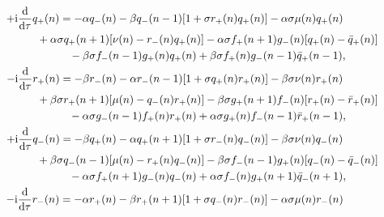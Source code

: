\documentclass[pdftex]{sigma}
\numberwithin{equation}{section}
\begin{document}
\begin{gather}
	 +\mathrm{i}\frac{\mathrm{d}}{\mathrm{d}\tau}q_{+}(n) = - \alpha q_{-}(n) - \beta q_{-}(n-1)[1+\sigma r_{+}(n)q_{+}(n)] - \alpha\sigma\mu(n)q_{+}(n)\nonumber\\
 \hspace{0.25mm}\hphantom{+\mathrm{i}\frac{\mathrm{d}}{\mathrm{d}\tau}q_{+}(n) =}{}
	 +\alpha\sigma q_{+}(n+1)[\nu(n)-r_{-}(n)q_{+}(n)] - \alpha\sigma f_{+}(n+1)g_{-}(n)[q_{+}(n)-\bar{q}_{+}(n)]\nonumber\\
 \hspace{0.25mm}\hphantom{+\mathrm{i}\frac{\mathrm{d}}{\mathrm{d}\tau}q_{+}(n) =}{}
	 -\beta\sigma f_{-}(n-1)g_{+}(n)q_{+}(n) +\beta\sigma f_{+}(n)g_{-}(n-1)\bar{q}_{+}(n-1), \label{eq-6.1}
\\
	 -\mathrm{i}\frac{\mathrm{d}}{\mathrm{d}\tau}r_{+}(n) = -\beta r_{-}(n) - \alpha r_{-}(n-1)[1+\sigma q_{+}(n)r_{+}(n)] - \beta\sigma\nu(n)r_{+}(n)\nonumber\\
 \hspace{0.25mm}\hphantom{-\mathrm{i}\frac{\mathrm{d}}{\mathrm{d}\tau}r_{+}(n) =}{}
	 +\beta\sigma r_{+}(n+1)[\mu(n)-q_{-}(n)r_{+}(n)] - \beta\sigma g_{+}(n+1)f_{-}(n)[r_{+}(n)-\bar{r}_{+}(n)]\nonumber\\
 \hspace{0.25mm}\hphantom{-\mathrm{i}\frac{\mathrm{d}}{\mathrm{d}\tau}r_{+}(n) =}{}
	 -\alpha\sigma g_{-}(n-1)f_{+}(n)r_{+}(n) +\alpha\sigma g_{+}(n)f_{-}(n-1)\bar{r}_{+}(n-1), \label{eq-6.2}
\\
	 +\mathrm{i}\frac{\mathrm{d}}{\mathrm{d}\tau}q_{-}(n) = -\beta q_{+}(n) - \alpha q_{+}(n+1)[1+\sigma r_{-}(n)q_{-}(n)] - \beta\sigma\nu(n)q_{-}(n)\nonumber\\
 \hspace{0.25mm}\hphantom{+\mathrm{i}\frac{\mathrm{d}}{\mathrm{d}\tau}q_{-}(n) =}{}
	 +\beta\sigma q_{-}(n-1)[\mu(n)-r_{+}(n)q_{-}(n)] - \beta\sigma f_{-}(n-1)g_{+}(n)[q_{-}(n)-\bar{q}_{-}(n)]\nonumber\\
 \hspace{0.25mm}\hphantom{+\mathrm{i}\frac{\mathrm{d}}{\mathrm{d}\tau}q_{-}(n) =}{}
	 -\alpha\sigma f_{+}(n+1)g_{-}(n)q_{-}(n) +\alpha\sigma f_{-}(n)g_{+}(n+1)\bar{q}_{-}(n+1), \label{eq-6.3}
\\
	 -\mathrm{i}\frac{\mathrm{d}}{\mathrm{d}\tau}r_{-}(n) = -\alpha r_{+}(n) - \beta r_{+}(n+1)[1+\sigma q_{-}(n)r_{-}(n)] - \alpha\sigma\mu(n)r_{-}(n)\nonumber\\
 \hspace{0.25mm}\hphantom{-\mathrm{i}\frac{\mathrm{d}}{\mathrm{d}\tau}r_{-}(n) =}{}

\end{gather}
\end{document}
